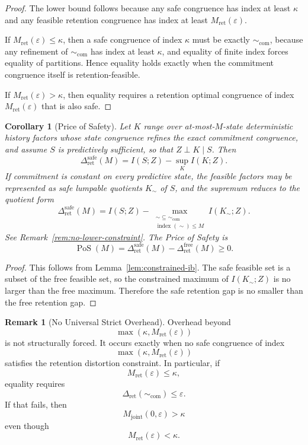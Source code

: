 \documentclass[12pt]{article}
\newtheorem{corollary}[theorem]{Corollary}
\theoremstyle{definition}
\newtheorem{remark}[theorem]{Remark}
\begin{document}
\begin{proof}
The lower bound follows because any safe congruence has index at least $\kappa$
and any feasible retention congruence has index at least
$M_{\mathrm{ret}}(\varepsilon)$.

If $M_{\mathrm{ret}}(\varepsilon)\le\kappa$, then a safe congruence of index
$\kappa$ must be exactly $\sim_{\mathrm{com}}$, because any refinement of
$\sim_{\mathrm{com}}$ has index at least $\kappa$, and equality of finite index
forces equality of partitions.  Hence equality holds exactly when the
commitment congruence itself is retention-feasible.

If $M_{\mathrm{ret}}(\varepsilon)>\kappa$, then equality requires a retention
optimal congruence of index $M_{\mathrm{ret}}(\varepsilon)$ that is also safe.
\end{proof}

\begin{corollary}[Price of Safety]
\label{cor:price-safety}
Let $K$ range over at-most-$M$-state deterministic history factors whose state
congruence refines the exact commitment congruence, and assume $S$ is
predictively sufficient, so that $Z\perp K\mid S$.  Then
\[
\Delta_{\mathrm{ret}}^{\mathrm{safe}}(M)
=
I(S;Z)
-
\sup_{K}
I(K;Z).
\]
If commitment is constant on every predictive state, the feasible factors may
be represented as safe lumpable quotients $K_\sim$ of $S$, and the supremum
reduces to the quotient form
\[
\Delta_{\mathrm{ret}}^{\mathrm{safe}}(M)
=
I(S;Z)
-
\max_{\substack{
\sim\subseteq\sim_{\mathrm{com}}\\
\operatorname{index}(\sim)\le M
}}
I(K_\sim;Z).
\]
See Remark~\ref{rem:no-lower-constraint}.
The Price of Safety is
\[
\operatorname{PoS}(M)
=
\Delta_{\mathrm{ret}}^{\mathrm{safe}}(M)
-
\Delta_{\mathrm{ret}}^{\mathrm{free}}(M)
\ge0.
\]
\end{corollary}

\begin{proof}
This follows from Lemma~\ref{lem:constrained-ib}.  The safe feasible set is a
subset of the free feasible set, so the constrained maximum of $I(K_\sim;Z)$
is no larger than the free maximum.  Therefore the safe retention gap is no
smaller than the free retention gap.
\end{proof}

\begin{remark}[No Universal Strict Overhead]
\label{rem:no-universal-overhead}
Overhead beyond
\[
\max(\kappa,M_{\mathrm{ret}}(\varepsilon))
\]
is not structurally forced.  It occurs exactly when no safe congruence of index
\[
\max(\kappa,M_{\mathrm{ret}}(\varepsilon))
\]
satisfies the retention distortion constraint.  In particular, if
\[
M_{\mathrm{ret}}(\varepsilon)\le\kappa,
\]
equality requires
\[
\Delta_{\mathrm{ret}}(\sim_{\mathrm{com}})\le\varepsilon.
\]
If that fails, then
\[
M_{\mathrm{joint}}(0,\varepsilon)>\kappa
\]
even though
\[
M_{\mathrm{ret}}(\varepsilon)<\kappa.
\]
\end{remark}
\end{document}
